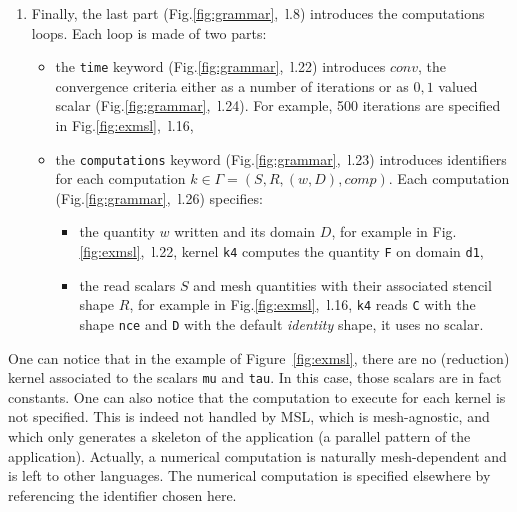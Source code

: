 \begin{enumerate}
\item Finally, the last part (Fig.\ref{fig:grammar},~l.8) introduces the computations loops. Each loop is made of two parts:
\begin{itemize}
\item the \texttt{time} keyword (Fig.\ref{fig:grammar},~l.22) introduces $conv$, the convergence criteria either as a number of iterations or as ${0,1}$ valued scalar (Fig.\ref{fig:grammar},~l.24). For example, 500 iterations are specified in Fig.\ref{fig:exmsl},~l.16,
\item the \texttt{computations} keyword (Fig.\ref{fig:grammar},~l.23) introduces identifiers for each computation $k\in\Gamma=(S,R,(w,D),comp)$. Each computation (Fig.\ref{fig:grammar},~l.26) specifies:
\begin{itemize}
 \item the quantity $w$ written and its domain $D$, for example in Fig.\ref{fig:exmsl},~l.22, kernel \texttt{k4} computes the quantity \texttt{F} on domain \texttt{d1},
 \item the read scalars $S$ and mesh quantities with their associated stencil shape $R$, for example in Fig.\ref{fig:exmsl},~l.16, \texttt{k4} reads \texttt{C} with the shape \texttt{nce} and \texttt{D} with the default \textit{identity} shape, it uses no scalar.
 \end{itemize}
\end{itemize}
\end{enumerate}

One can notice that in the example of Figure~\ref{fig:exmsl}, there are no (reduction) kernel associated to the scalars \texttt{mu} and \texttt{tau}.
In this case, those scalars are in fact constants.
One can also notice that the computation to execute for each kernel is not specified.
This is indeed not handled by MSL, which is mesh-agnostic, and which only generates a skeleton of the application (a parallel pattern of the application). Actually, a numerical computation is naturally mesh-dependent and is left to other languages. The numerical computation is specified elsewhere by referencing the identifier chosen here.

